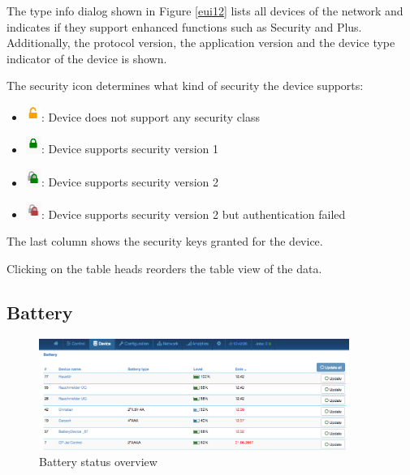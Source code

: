 The type info dialog shown in Figure \ref{eui12} lists all devices of the network and
indicates if they support enhanced \zwave functions such as Security and \zwave Plus.
Additionally, the \zwave protocol version, the application version and the device type 
indicator of the device is shown.

The security icon determines what kind of security the device supports:

\begin{itemize}
\item \includegraphics[width=0.04\textwidth]{pngs/cap7/s2icon1.png}: Device does not support any security class
\item \includegraphics[width=0.04\textwidth]{pngs/cap7/s2icon3.png}: Device supports security version 1
\item \includegraphics[width=0.04\textwidth]{pngs/cap7/s2icon4.png}: Device supports security version 2
\item \includegraphics[width=0.04\textwidth]{pngs/cap7/s2icon2.png}: Device supports security version 2 but authentication failed
\end{itemize}

The last column shows the security keys granted for the device.

Clicking on the table heads reorders the table view of the data.


\subsection{Battery}

\begin{figure}
\begin{center}
\includegraphics[width=0.9\textwidth]{pngs/cap7/eui13.png}
\caption{Battery status overview}
\label{eui13}
\end{center}
\end{figure}

